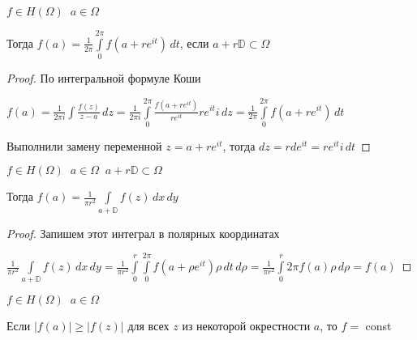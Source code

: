
\begin{theorem}[о среднем]\thmslashn
	
	$f \in H(\Omega) \;\; a\in \Omega$
	
	Тогда $f(a) = \frac{1}{2\pi}\int\limits_0^{2\pi} f(a + re^{it})\,dt$, если $a + r\mathbb{D} \subset \Omega$
	
\end{theorem}

\begin{proof}\thmslashn
	
	По интегральной формуле Коши
	
    $f(a) = \frac{1}{2\pi i}\int\frac{f(z)}{z-a}\,dz = \frac{1}{2\pi i}\int\limits_0^{2\pi} \frac{f(a +re^{it})}{re^{it}} re^{it} i\,dz = \frac{1}{2\pi}\int\limits_0^{2\pi} f(a + re^{it})\,dt$
	
	Выполнили замену переменной $z = a + re^{it}$, тогда $dz = rde^{it} = re^{it} i \,dt$
	
\end{proof}

\begin{consequence}\thmslashn
	
	$f \in H(\Omega) \;\; a \in \Omega \;\; a + r \mathbb{D} \subset \Omega$
	
	Тогда $f(a) = \frac{1}{\pi r^2} \int\limits_{a + \mathbb{D}} f(z)\,dx\,dy$
	
\end{consequence}

\begin{proof}\thmslashn
	
	Запишем этот интеграл в полярных координатах 
	
	$\frac{1}{\pi r^2} \int\limits_{a + \mathbb{D}} f(z)\,dx\,dy = \frac{1}{\pi r^2} \int\limits_0^r \int\limits_0^{2\pi} f(a + \rho e^{it}) \rho \,dt\,d\rho = \frac{1}{\pi r^2} \int\limits_0^r 2\pi f(a) \rho \,d\rho =  f(a)$
	
\end{proof}

\begin{theorem}\thmslashn
	
	$f \in H(\Omega) \;\; a\in \Omega$
	
	Если $|f(a)| \geqslant |f(z)|$ для всех $z$ из некоторой окрестности $a$, то $f =$ const
	
\end{theorem}


